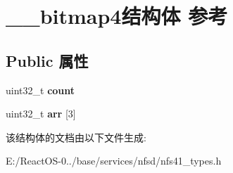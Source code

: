 \hypertarget{struct____bitmap4}{}\section{\+\_\+\+\_\+bitmap4结构体 参考}
\label{struct____bitmap4}
\subsection*{Public 属性}
\begin{DoxyCompactItemize}
\item 
\mbox{\label{struct____bitmap4_adf80b72a3d822b6eec294cae156763c0}} 
uint32\+\_\+t {\bfseries count}
\item 
\mbox{\label{struct____bitmap4_ae721105351f079168fdb0da43c2d3f96}} 
uint32\+\_\+t {\bfseries arr} \mbox{[}3\mbox{]}
\end{DoxyCompactItemize}


该结构体的文档由以下文件生成\+:\begin{DoxyCompactItemize}
\item 
E\+:/\+React\+O\+S-\/0../base/services/nfsd/nfs41\+\_\+types.\+h\end{DoxyCompactItemize}
